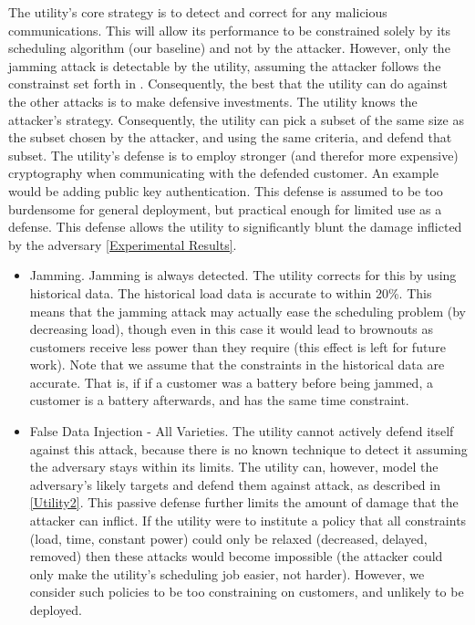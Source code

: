 \documentclass[conference]{IEEEtran}
\begin{document}
The utility's core strategy is to detect and correct for any malicious communications. This will allow its performance to be
constrained solely by its scheduling algorithm (our baseline) and not by the attacker. However, only the jamming attack is detectable by the utility, assuming the attacker follows the constrainst set forth in \cite{yuan2011modeling}. Consequently, the best that the utility can do against the other attacks is to make defensive investments. The utility knows the attacker's strategy.  Consequently, the utility can pick a subset of the same size as the subset chosen by the attacker, and using the same criteria, and defend that subset. The utility's defense is to employ stronger (and therefor more expensive) cryptography when communicating with the defended customer.  An example would be adding public key authentication. This defense is assumed to be too burdensome for general deployment, but practical enough for limited use as a defense. This defense allows the utility to significantly blunt the damage inflicted by the adversary \ref{Experimental Results}.

\begin{itemize}
\item Jamming. Jamming is always detected. The utility corrects for this by using historical data. The historical load data is accurate to within 20\%.  This means that the jamming attack may actually ease the scheduling problem (by decreasing load), though even in this case it would lead to brownouts as customers receive less power than they require (this effect is left for future work).  Note that we assume that the constraints in the historical data are accurate. That is, if if a customer was a battery before being jammed, a customer is a battery afterwards, and has the same time constraint.

\item False Data Injection - All Varieties. The utility cannot actively defend itself against this attack, because there is no known technique to detect it assuming the adversary stays within its limits. The utility can, however, model the adversary's likely targets and defend them against attack, as described in \ref{Utility2}. This passive defense further limits the amount of damage that the attacker can inflict. If the utility were to institute a policy that all constraints (load, time, constant power) could only be relaxed (decreased, delayed, removed) then these attacks would become impossible (the attacker could only make the utility's scheduling job easier, not harder). However, we consider such policies to be too constraining on customers, and unlikely to be deployed.

\end{itemize}
\end{document}
